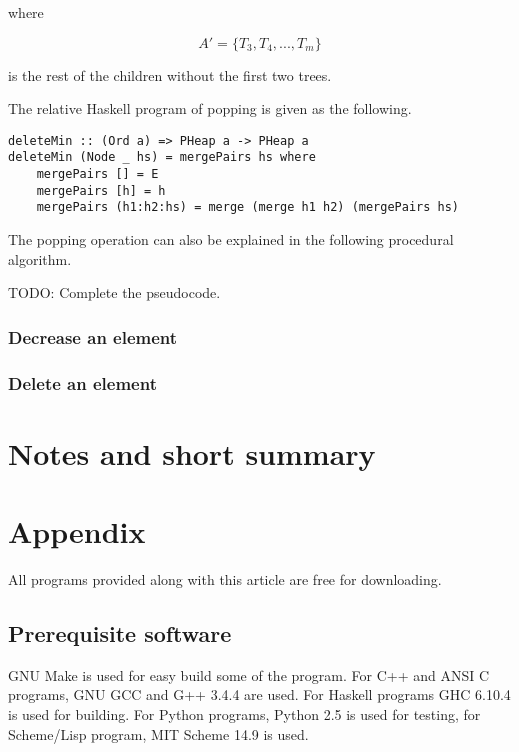 \documentclass{article}
\begin{document}
where

\[
A' = \{ T_3, T_4, ..., T_m\}
\]

is the rest of the children without the first two trees.

The relative Haskell program of popping is given as the following.

\lstset{language=Haskell}
\begin{lstlisting}
deleteMin :: (Ord a) => PHeap a -> PHeap a
deleteMin (Node _ hs) = mergePairs hs where
    mergePairs [] = E
    mergePairs [h] = h
    mergePairs (h1:h2:hs) = merge (merge h1 h2) (mergePairs hs)
\end{lstlisting}

The popping operation can also be explained in the following 
procedural algorithm.

TODO: Complete the pseudocode.
\begin{algorithmic}
\EndFunction
\end{algorithmic}


\subsubsection{Decrease an element}

\subsubsection{Delete an element}

\section{Notes and short summary}

\section{Appendix} \label{appendix}
All programs provided along with this article are free for
downloading.

\subsection{Prerequisite software}
GNU Make is used for easy build some of the program. For C++ and ANSI C programs,
GNU GCC and G++ 3.4.4 are used. 
For Haskell programs GHC 6.10.4 is used
for building. For Python programs, Python 2.5 is used for testing, for
Scheme/Lisp program, MIT Scheme 14.9 is used.
\end{document}
